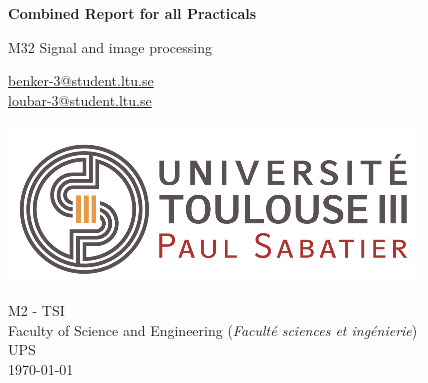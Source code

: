 \begin{titlepage}
    \begin{center}
    
        \vspace*{1cm}
        \Huge
        \textbf{
        Combined Report for all Practicals}
            
        \vspace{0.5cm}
        \LARGE
        M32 Signal and image processing

            
        \vspace{2cm}
        \Large
        \begin{flushleft}
                \tab\url{benker-3@student.ltu.se} \\
                  \tab\url{loubar-3@student.ltu.se}     
            
        \end{flushleft}
            
        \vfill
            
        \includegraphics[width=0.5\linewidth]{Graphics/Vignette logo.png}
        \vfill
   
        
        \begin{flushleft}
            \large
            M2 - \ac{TSI}\\
            Faculty of Science and Engineering (\textit{Faculté sciences et ingénierie}) \\
            \ac{UPS} \\
            \today
        \end{flushleft}
                   
            
    \end{center}
\end{titlepage}